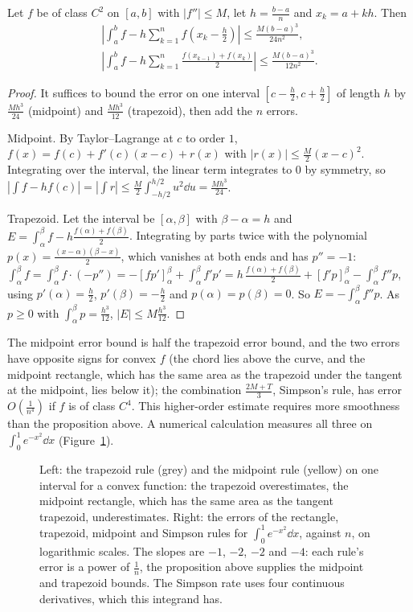 \begin{proposition}\label{prop:quadrature}
Let $f$ be of class $C^2$ on $[a,b]$ with $|f''|\le M$, let $h=\frac{b-a}n$ and $x_k=a+kh$. Then
\[
\begin{gathered}
\left|\int_a^bf-h\sum_{k=1}^nf\!\left(x_k-\tfrac h2\right)\right|\le\frac{M(b-a)^3}{24n^2},\\
\left|\int_a^bf-h\sum_{k=1}^n\frac{f(x_{k-1})+f(x_k)}2\right|\le\frac{M(b-a)^3}{12n^2}.
\end{gathered}
\]
\end{proposition}
\begin{proof}
It suffices to bound the error on one interval $[c-\frac h2,c+\frac h2]$ of length $h$ by $\frac{Mh^3}{24}$ (midpoint) and $\frac{Mh^3}{12}$ (trapezoid), then add the $n$ errors.

Midpoint. By Taylor--Lagrange at $c$ to order $1$, $f(x)=f(c)+f'(c)(x-c)+r(x)$ with $|r(x)|\le\frac M2(x-c)^2$. Integrating over the interval, the linear term integrates to $0$ by symmetry, so
$\left|\int f-hf(c)\right|=\left|\int r\right|\le\frac M2\int_{-h/2}^{h/2}u^2\dd u=\frac{Mh^3}{24}$.

Trapezoid. Let the interval be $[\alpha,\beta]$ with $\beta-\alpha=h$ and $E=\int_\alpha^\beta f-h\frac{f(\alpha)+f(\beta)}2$. Integrating by parts twice with the polynomial $p(x)=\frac{(x-\alpha)(\beta-x)}2$, which vanishes at both ends and has $p''=-1$:
$\int_\alpha^\beta f=\int_\alpha^\beta f\cdot(-p'')=-\left[fp'\right]_\alpha^\beta+\int_\alpha^\beta f'p'=h\,\frac{f(\alpha)+f(\beta)}2+\left[f'p\right]_\alpha^\beta-\int_\alpha^\beta f''p$, using $p'(\alpha)=\frac h2$, $p'(\beta)=-\frac h2$ and $p(\alpha)=p(\beta)=0$. So $E=-\int_\alpha^\beta f''p$. As $p\ge0$ with $\int_\alpha^\beta p=\frac{h^3}{12}$, $|E|\le M\frac{h^3}{12}$.
\end{proof}

The midpoint error bound is half the trapezoid error bound, and the two errors have opposite signs for convex $f$ (the chord lies above the curve, and the midpoint rectangle, which has the same area as the trapezoid under the tangent at the midpoint, lies below it); the combination $\frac{2M+T}3$, Simpson's rule, has error $O\left(\frac1{n^4}\right)$ if $f$ is of class $C^4$. This higher-order estimate requires more smoothness than the proposition above. A numerical calculation measures all three on $\int_0^1e^{-x^2}\dd x$ (Figure~\ref{fig:quadrature}).

\begin{figure}[ht]
\centering
{}
\caption{Left: the trapezoid rule (grey) and the midpoint rule (yellow) on one interval for a convex function: the trapezoid overestimates, the midpoint rectangle, which has the same area as the tangent trapezoid, underestimates. Right: the errors of the rectangle, trapezoid, midpoint and Simpson rules for $\int_0^1e^{-x^2}\dd x$, against $n$, on logarithmic scales. The slopes are $-1$, $-2$, $-2$ and $-4$: each rule's error is a power of $\frac1n$, the proposition above supplies the midpoint and trapezoid bounds. The Simpson rate uses four continuous derivatives, which this integrand has.}
\label{fig:quadrature}
\end{figure}

